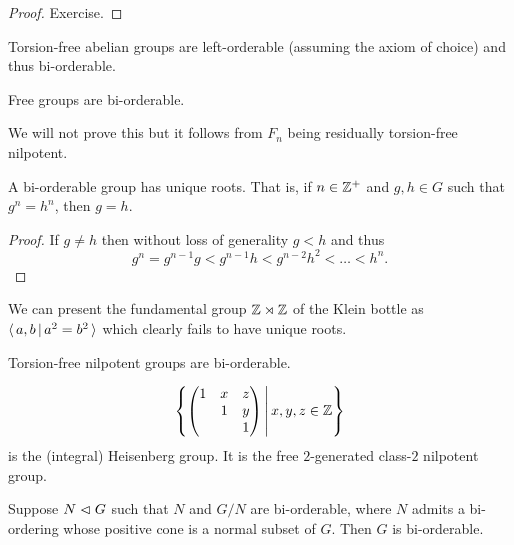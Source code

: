 \begin{proof}
    Exercise.
\end{proof}

\begin{example}
    Torsion-free abelian groups are left-orderable (assuming the axiom of choice) and thus bi-orderable.
\end{example}

\begin{example}
    Free groups are bi-orderable.
\end{example}

We will not prove this but it follows from $F_n$ being residually torsion-free nilpotent.

\begin{lemma}
    A bi-orderable group has unique roots.
    That is, if $n \in \mathbb{Z}^+$ and $g, h \in G$ such that $g^n = h^n$, then $g = h$.
\end{lemma}

\begin{proof}
    If $g \neq h$ then without loss of generality $g < h$ and thus \[
        g^n = g^{n-1} g < g^{n-1} h < g^{n-2} h^2 < \dots < h^n.
    \]
\end{proof}

\begin{example}
    We can present the fundamental group $\mathbb{Z} \rtimes \mathbb{Z}$ of the Klein bottle as $\langle \, a, b \, | \, a^2 = b^2 \, \rangle$ which clearly fails to have unique roots.
\end{example}

\begin{proposition}
    \label{proposition:nilpotent_biorderable}
    Torsion-free nilpotent groups are bi-orderable.
\end{proposition}

\begin{example}
    \[
        \left\{ 
            \begin{pmatrix}
                1 & x & z \\
                  & 1 & y \\
                  &   & 1
            \end{pmatrix}
         \,\middle|\, 
            x, y, z \in \mathbb{Z}
         \right\}
    \] is the (integral) Heisenberg group.
    It is the free $2$-generated class-$2$ nilpotent group.
\end{example}

\begin{lemma}
    \label{lemma:biorderable_extensions}
    Suppose $N \vartriangleleft G$ such that $N$ and $G/N$ are bi-orderable, where $N$ admits a bi-ordering whose positive cone is a normal subset of $G$.
    Then $G$ is bi-orderable.
\end{lemma}

